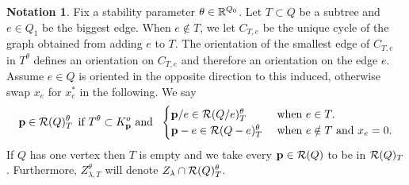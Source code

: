 \documentclass{amsart}
\theoremstyle{definition}
\newtheorem{notn}[thm]{Notation}
\begin{document}
\begin{notn}\label{notn:intree}
Fix a stability parameter $\theta \in \mathbb{R}^{Q_0}$. 
Let $T \subset Q$ be a subtree and $e\in Q_1$ be the biggest edge. 
When $e \notin T$, we let $C_{T,e}$ be the unique cycle of the graph obtained from adding $e$ to $T$.
The orientation of the smallest edge of $C_{T,e}$ in $T^\theta$ defines an orientation on $C_{T,e}$ and therefore an orientation on the edge $e$.
Assume $e \in Q$ is oriented in the opposite direction to this induced, otherwise swap $x_e$ for $x_e^*$ in the following.
We say 
$$\mathbf{p} \in \mathcal{R}(Q)_T^\theta \,\text{ if } T^\theta \subset K_{\mathbf{p}}^o \text{ and } \,\,\begin{cases} \mathbf{p}/e \in \mathcal{R}(Q/e)_T^\theta & \text{ when } e \in T. \\ \mathbf{p}-e \in \mathcal{R}(Q-e)_T^\theta & \text{ when } e \notin T \text{ and } x_e =0.\end{cases}$$
If $Q$ has one vertex then $T$ is empty and we take every $\mathbf{p} \in \mathcal{R}(Q)$ to be in $\mathcal{R}(Q)_T$.
Furthermore, $Z_{\lambda,T}^\theta$ will denote $Z_{\lambda} \cap \mathcal{R}(Q)_T^\theta$.
\end{notn}
\end{document}
